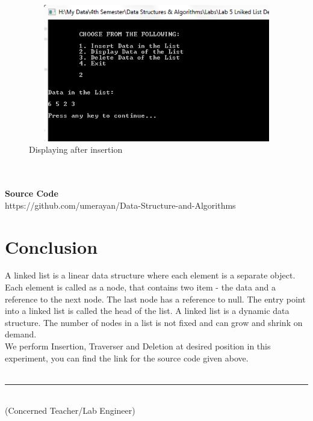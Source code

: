 \documentclass[11pt]{article}            %
\newcommand\tab[1][1cm]{\hspace*{#1}}
\begin{document}
\begin{figure}[H]
\centering
  \includegraphics[width=12cm,height=6cm,keepaspectratio]{4.png}
\caption{Displaying after insertion}
\label{Figure:1}    
\end{figure}

\textbf{}\\~\\
\textbf{Source Code} \\
https://github.com/umerayan/Data-Structure-and-Algorithms

\section{Conclusion}
A linked list is a linear data structure where each element is a separate object. Each element is called as a node, that contains two item - the data and a reference to the next node. The last node has a reference to null. The entry point into a linked list is called the head of the list. A linked list is a dynamic data structure. The number of nodes in a list is not fixed and can grow and shrink on demand.\\
We perform Insertion, Traverser and Deletion at desired position in this experiment, you can find the link for the source code given above.\\~\\

\tab[6cm] \noindent\rule{6cm}{0.4pt}\\
\tab[6cm] (Concerned Teacher/Lab Engineer)


 
\end{document}
